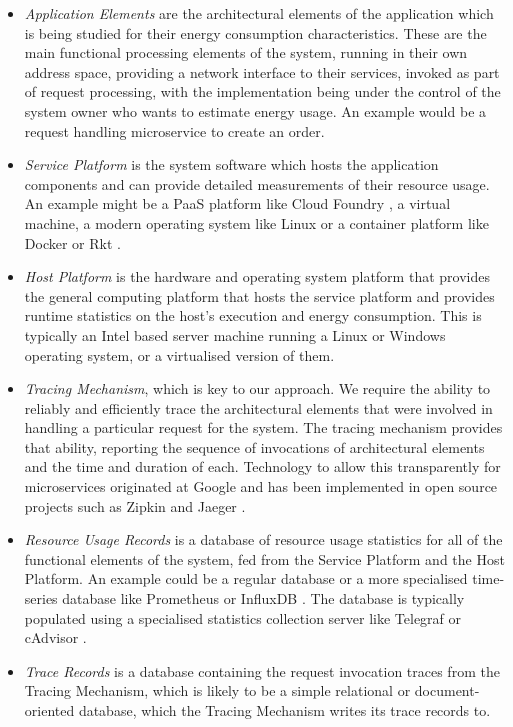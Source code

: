\begin{itemize}
\item \emph{Application Elements} are the architectural elements of the application which is being studied for their energy consumption characteristics.  These are the main functional processing elements of the system, running in their own address space, providing a network interface to their services, invoked as part of request processing, with the implementation being under the control of the system owner who wants to estimate energy usage.  An example would be a request handling microservice to create an order.
\item \emph{Service Platform} is the system software which hosts the application components and can provide detailed measurements of their resource usage.  An example might be a PaaS platform like Cloud Foundry \cite{cloudfoundry2018}, a virtual machine, a modern operating system like Linux or a container platform like Docker \cite{docker2018} or Rkt \cite{rkt2018}.
\item \emph{Host Platform} is the hardware and operating system platform that provides the general computing platform that hosts the service platform and provides runtime statistics on the host's execution and energy consumption.  This is typically an Intel based server machine running a Linux or Windows operating system, or a virtualised version of them.
\item \emph{Tracing Mechanism}, which is key to our approach.  We require the ability to reliably and efficiently trace the architectural elements that were involved in handling a particular request for the system.  The tracing mechanism provides that ability, reporting the sequence of invocations of architectural elements and the time and duration of each.  Technology to allow this transparently for microservices originated at Google \cite{sigelman2010-dapper} and has been implemented in open source projects such as Zipkin \cite{zipkin2018} and Jaeger \cite{jaeger2018}.
\item \emph{Resource Usage Records} is a database of resource usage statistics for all of the functional elements of the system, fed from the Service Platform and the Host Platform.  An example could be a regular database or a more specialised time-series database like Prometheus \cite{prometheus2018} or InfluxDB \cite{influxdb2018}.  The database is typically populated using a specialised statistics collection server like Telegraf \cite{telegraf2018} or cAdvisor \cite{cadvisor2018}.
\item \emph{Trace Records} is a database containing the request invocation traces from the Tracing Mechanism, which is likely to be a simple relational or document-oriented database, which the Tracing Mechanism writes its trace records to.

\end{itemize}

